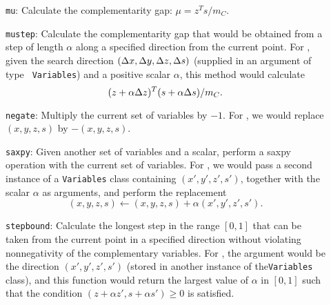 \begin{description}
\item[] {\tt mu}: Calculate the complementarity gap: $\mu = z^Ts/m_C$.
  
\item[] {\tt mustep}: Calculate the complementarity gap that would be
obtained from a step of length $\alpha$ along a specified direction
from the current point. For , given the search direction
$(\Delta x, \Delta y, \Delta z, \Delta s)$ (supplied in an argument of type {\tt
Variables}) and a positive scalar $\alpha$, this method would
calculate
\[
(z+\alpha \Delta z)^T (s+\alpha \Delta s) / m_C.
\]

\item[] {\tt negate}: Multiply the current set of variables by $-1$. For
, we would replace $(x,y,z,s)$ by $-(x,y,z,s)$.
  
\item[] {\tt saxpy}: Given another set of variables and a scalar,
perform a saxpy operation with the current set of variables. For
, we would pass a second instance of a {\tt Variables} class
containing $(x',y',z',s')$, together with the scalar $\alpha$ as
arguments, and perform the replacement
\[
(x,y,z,s) \leftarrow  (x,y,z,s) + \alpha (x',y',z',s').
\]

\item[] {\tt stepbound}: Calculate the longest step in the range
$[0,1]$ that can be taken from the current point in a specified
direction without violating nonnegativity of the complementary
variables. For , the argument would be the direction
$(x',y',z',s')$ (stored in another instance of the{\tt Variables}
class), and this function would return the largest value of $\alpha$
in $[0,1]$ such that the condition $(z + \alpha z', s + \alpha s') \ge
0$ is satisfied.
  

\end{description}
